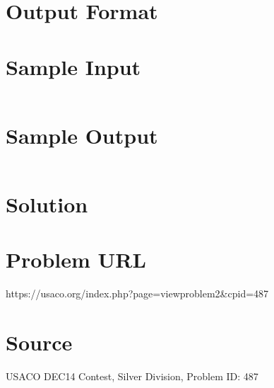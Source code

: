 \documentclass[12pt]{article}
\begin{document}
\section*{Output Format}


\section*{Sample Input}
\begin{verbatim}

\end{verbatim}

\section*{Sample Output}
\begin{verbatim}

\end{verbatim}

\section*{Solution}


\section*{Problem URL}
https://usaco.org/index.php?page=viewproblem2&cpid=487

\section*{Source}
USACO DEC14 Contest, Silver Division, Problem ID: 487
\end{document}
